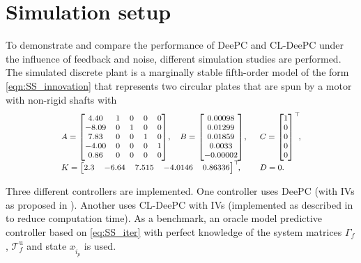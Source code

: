 \section{Simulation setup}\label{sec:simulation_setup}
\noindent To demonstrate and compare the performance of \ac{DeePC} and \ac{CL-DeePC} under the influence of feedback and noise, different simulation studies are performed. The simulated discrete plant is a marginally stable fifth-order 
model of the form \eqref{eqn:SS_innovation} that represents two circular plates that are spun by a motor with non-rigid shafts with \citep{Favoreel1999b}
\begin{align}\label{eq:SysFavoreel}
\scriptsize
\begin{array}{lll}
    A = \begin{bmatrix}
        4.40 & 1 & 0 & 0 & 0\\
       -8.09 & 0 & 1 & 0 & 0\\
        7.83 & 0 & 0 & 1 & 0\\
       -4.00 & 0 & 0 & 0 & 1\\
        0.86 & 0 & 0 & 0 & 0
    \end{bmatrix}\!,&
    B = \begin{bmatrix}
        0.00098\\
        0.01299\\
        0.01859\\
        0.0033\\
       -0.00002
    \end{bmatrix}\!,&C = \begin{bmatrix}
        1 \\ 0 \\ 0\\ 0\\ 0
    \end{bmatrix}^\top\mkern-7mu,\\
    K = \begin{bmatrix}
        2.3 & -6.64 & 7.515 & -4.0146 & 0.86336
    \end{bmatrix}^\top\mkern-7mu,\span
    &D=0.
\end{array}
\end{align}

Three different controllers are implemented. One controller uses \ac{DeePC} (with \ac{IVs} as proposed in \cite{vanWingerden2022}). Another uses \ac{CL-DeePC} with \ac{IVs} (implemented as described in  to reduce computation time). As a benchmark, an oracle model predictive controller based on \eqref{eq:SS_iter} with perfect knowledge of the system matrices $\Gamma_f$, $\mathcal{T}_f^\mathrm{u}$ and state $x_{\hat{i}_p}$ is used.

